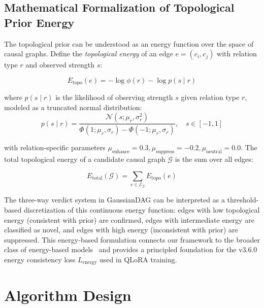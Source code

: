 \documentclass[11pt,a4paper]{article}
\begin{document}
\subsection{Mathematical Formalization of Topological Prior Energy}

The topological prior can be understood as an energy function over the space of causal graphs. Define the \textit{topological energy} of an edge \(e = (c_i, c_j)\) with relation type \(r\) and observed strength \(s\):

\begin{equation}
E_{\text{topo}}(e) = -\log \phi(r) - \log p(s \mid r)
\label{eq:topo_energy}
\end{equation}

where \(p(s \mid r)\) is the likelihood of observing strength \(s\) given relation type \(r\), modeled as a truncated normal distribution:
\begin{equation}
p(s \mid r) = \frac{\mathcal{N}(s; \mu_r, \sigma_r^2)}{\Phi(1; \mu_r, \sigma_r) - \Phi(-1; \mu_r, \sigma_r)}, \quad s \in [-1, 1]
\label{eq:likelihood}
\end{equation}

with relation-specific parameters \(\mu_{\text{enhance}} = 0.3, \mu_{\text{suppress}} = -0.2, \mu_{\text{neutral}} = 0.0\). The total topological energy of a candidate causal graph \(\mathcal{G}\) is the sum over all edges:

\begin{equation}
E_{\text{total}}(\mathcal{G}) = \sum_{e \in \mathcal{E}_{\mathcal{G}}} E_{\text{topo}}(e)
\label{eq:total_energy}
\end{equation}

The three-way verdict system in GaussianDAG can be interpreted as a threshold-based discretization of this continuous energy function: edges with low topological energy (consistent with prior) are confirmed, edges with intermediate energy are classified as novel, and edges with high energy (inconsistent with prior) are suppressed. This energy-based formulation connects our framework to the broader class of energy-based models~\cite{lecun2006} and provides a principled foundation for the v3.6.0 energy consistency loss \(L_{\text{energy}}\) used in QLoRA training.

\section{Algorithm Design}
\label{sec:algorithms}
\end{document}
